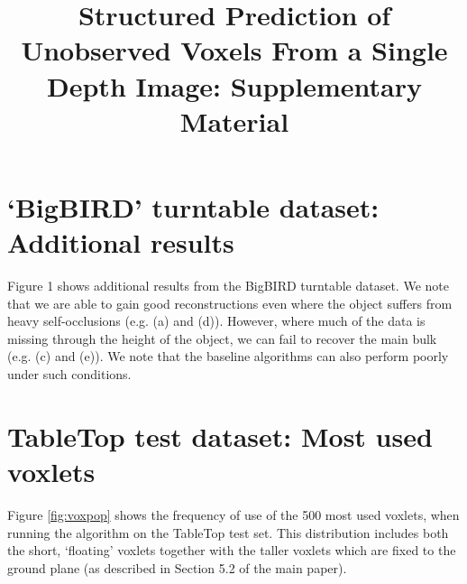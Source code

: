 \documentclass[10pt,onecolumn,letterpaper]{article}
\title{Structured Prediction of Unobserved Voxels From a Single Depth Image: Supplementary Material}
\makeatletter
\newcommand*{\ea}{et al.\@\xspace}
\makeatother
\begin{document}
\maketitle

\tableofcontents



\newpage
\section{`BigBIRD' turntable dataset: Additional results}

Figure 1 shows additional results from the BigBIRD turntable dataset.
We note that we are able to gain good reconstructions even where the object suffers from heavy self-occlusions  (e.g. (a) and (d)).
However, where much of the data is missing through the height of the object, we can fail to recover the main bulk (e.g. (c) and (e)).
We note that the baseline algorithms can also perform poorly under such conditions.
%
%     



\newpage
\section{TableTop test dataset: Most used voxlets}

Figure \ref{fig:voxpop} shows the frequency of use of the 500 most used voxlets, when running the algorithm on the TableTop test set.
This distribution includes both the short, `floating' voxlets together with the taller voxlets which are fixed to the ground plane (as described in Section 5.2 of the main paper).
\end{document}
